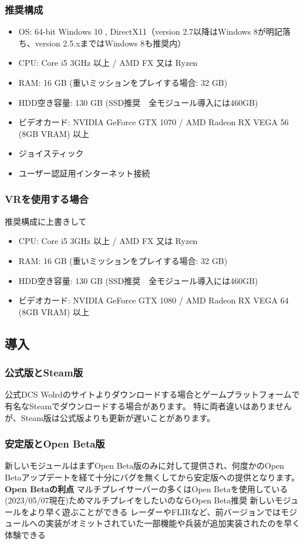 \subsubsection{推奨構成}
\begin{itemize}
  \item OS: 64-bit Windows 10 , DirectX11（version 2.7以降はWindows 8が明記落ち、version 2.5.xまではWindows 8も推奨内）
  \item CPU: Core i5 3GHz 以上 / AMD FX 又は Ryzen
  \item RAM: 16 GB (重いミッションをプレイする場合: 32 GB)
  \item HDD空き容量: 130 GB (SSD推奨　全モジュール導入には460GB)
  \item ビデオカード: NVIDIA GeForce GTX 1070 / AMD Radeon RX VEGA 56 (8GB VRAM) 以上
  \item ジョイスティック
  \item ユーザー認証用インターネット接続
\end{itemize}

\subsubsection{VRを使用する場合}
推奨構成に上書きして
\begin{itemize}
  \item CPU: Core i5 3GHz 以上 / AMD FX 又は Ryzen
  \item RAM: 16 GB (重いミッションをプレイする場合: 32 GB)
  \item HDD空き容量: 130 GB (SSD推奨　全モジュール導入には460GB)
  \item ビデオカード: NVIDIA GeForce GTX 1080 / AMD Radeon RX VEGA 64 (8GB VRAM) 以上
\end{itemize}

\subsection{導入}
\subsubsection{公式版とSteam版}
公式DCS Wolrdのサイトよりダウンロードする場合とゲームプラットフォームで有名なSteamでダウンロードする場合があります。
特に両者違いはありませんが、Steam版は公式版よりも更新が遅いことがあります。

\subsubsection{安定版とOpen Beta版}
新しいモジュールはまずOpen Beta版のみに対して提供され、何度かのOpen Betaアップデートを経て十分にバグを無くしてから安定版への提供となります。
  \textbf{Open Betaの利点}
マルチプレイサーバーの多くはOpen Betaを使用している(2023/05/07現在)ためマルチプレイをしたいのならOpen Beta推奨
新しいモジュールをより早く遊ぶことができる
レーダーやFLIRなど、前バージョンではモジュールへの実装がオミットされていた一部機能や兵装が追加実装されたのを早く体験できる

